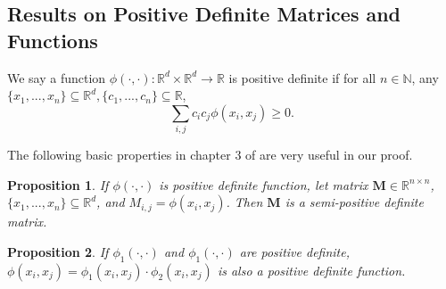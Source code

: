 \documentclass{article}
\newcommand{\cO}{\mathcal{O}}
\newtheorem{pro}{\textbf{Proposition}}[section]
\newcommand{\dataset}{{\cal D}}
\begin{document}

\subsection{Results on Positive Definite Matrices and Functions}
We say a function $\phi(\cdot,\cdot):\mathbb{R}^d\times \mathbb{R}^d\to \mathbb{R}$ is positive definite if for all $n \in \mathbb{N}$, any $\{x_1,...,x_n\}\subseteq \mathbb{R}^d, \{c_1,...,c_n\}\subseteq \mathbb{R}$,
\begin{equation}
\sum_{i,j}c_ic_j\phi(x_i,x_j)\geq 0.
\end{equation}

The following basic properties in chapter 3 of \cite{Christian} are very useful in our proof.
\begin{pro}
If $\phi(\cdot,\cdot)$ is positive definite function, let matrix $\bm{M}\in \mathbb{R}^{n\times n}$, $\{x_1,...,x_n\}\subseteq \mathbb{R}^d$, and $M_{i,j}= \phi(x_i,x_j)$. Then $\bm{M}$ is a semi-positive definite matrix.
\end{pro}
\begin{pro}\label{c1}
If $\phi_1(\cdot,\cdot)$ and $\phi_1(\cdot,\cdot)$ are positive definite, $\phi(x_i,x_j)=\phi_1(x_i,x_j)\cdot \phi_2(x_i,x_j)$ is also a positive definite function.
\end{pro}
\end{document}

